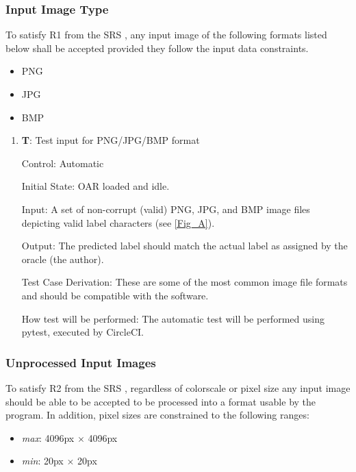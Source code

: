 \documentclass[12pt, titlepage]{article}
\newcounter{testnum} %
\begin{document}
\subsubsection{Input Image Type}

To satisfy R1 from the SRS \citep{SRS}, any input image of the following formats listed below shall be 
accepted provided they follow the input data constraints.

\begin{itemize}
  \item{PNG}
  \item{JPG}
  \item{BMP\\}
\end{itemize}

\begin{enumerate}

  \item{\textbf{T\thetestnum \label{T_inputImage}}: Test input for PNG/JPG/BMP format\\}
            
  Control: Automatic
            
  Initial State: OAR loaded and idle.
            
  Input: A set of non-corrupt (valid) PNG, JPG, and BMP image files depicting valid label characters (see \ref{Fig_A}).
            
  Output: The predicted label should match the actual label as assigned by the oracle (the author).
            
  Test Case Derivation: These are some of the most common image file formats and should be compatible with the software.
            
  How test will be performed: The automatic test will be performed using pytest, executed by CircleCI.
\end{enumerate}

\subsubsection{Unprocessed Input Images}
To satisfy R2 from the SRS \citep{SRS}, regardless of colorscale or pixel size any input image should be able to be accepted to 
be processed into a format usable by the program. In addition, pixel sizes are constrained to the following ranges:

\begin{itemize}
  \item{\textit{max}: 4096px $\times$ 4096px}
  \item{\textit{min}: 20px $\times$ 20px}
\end{itemize}
\end{document}
